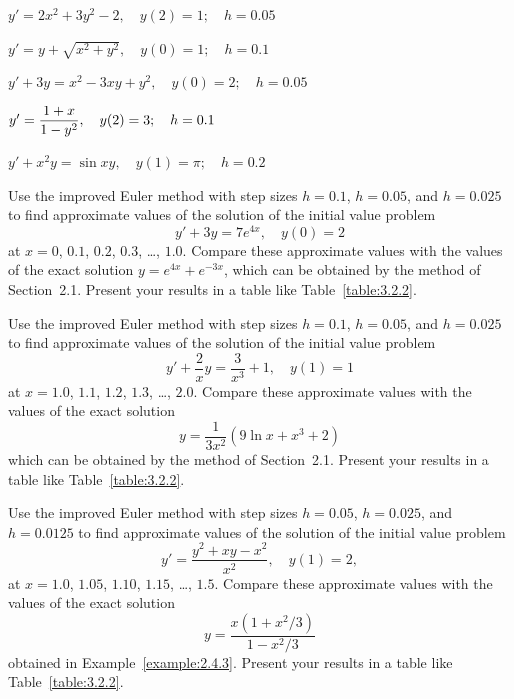 \begin{exerciselist}
  \item\label{exer:3.2.1} \Cex $y'=2x^{2}+3y^{2}-2,\quad y(2)=1;\quad h=0.05$ \,

  \item\label{exer:3.2.2} \Cex $y'=y+\sqrt{x^{2}+y^{2}},\quad y(0)=1;\quad h=0.1$ \,

  \item\label{exer:3.2.3} \Cex $y'+3y=x^{2}-3xy+y^{2},\quad y(0)=2;\quad h=0.05$ \,

  \item\label{exer:3.2.4} \Cex $y'=\displaystyle\frac{1+x}{1-y^{2}},\quad y(2)=3;\quad h=0.1$\

  \item\label{exer:3.2.5} \Cex $y'+x^{2}y=\sin xy,\quad y(1)=\pi;\quad h=0.2$

  \item\label{exer:3.2.6} \Cex Use the improved Euler method with step sizes $h=0.1$, $h=0.05$, and
        $h=0.025$ to find approximate values of the solution of the initial value problem
  \[
    y'+3y=7e^{4x},\quad y(0)=2
  \]
  at $x=0$, $0.1$, $0.2$, $0.3$, \dots, $1.0$. Compare these approximate values with the values of
  the exact solution $y=e^{4x}+e^{-3x}$, which can be obtained by the method of Section~2.1. Present
  your results in a table like Table~\ref{table:3.2.2}.

  \item\label{exer:3.2.7} \Cex Use the improved Euler method with step sizes $h=0.1$, $h=0.05$, and
        $h=0.025$ to find approximate values of the solution of the initial value problem
  \[
    y'+\frac{2}{x}y=\frac{3}{x^{3}}+1,\quad y(1)=1
  \]
  at $x=1.0$, $1.1$, $1.2$, $1.3$, \dots, $2.0$. Compare these approximate values with the values of
  the exact solution
  \[
    y=\frac{1}{3x^{2}}(9\ln x+x^{3}+2)
  \]
  which can be obtained by the method of Section~2.1. Present your results in a table like
  Table~\ref{table:3.2.2}.

  \item\label{exer:3.2.8} \Cex Use the improved Euler method with step sizes $h=0.05$, $h=0.025$,
        and $h=0.0125$ to find approximate values of the solution of the initial value problem
  \[
    y'=\frac{y^{2}+xy-x^{2}}{x^{2}},\quad y(1)=2,
  \]
  at $x=1.0$, $1.05$, $1.10$, $1.15$, \dots, $1.5$. Compare these approximate values with the values
  of the exact solution
  \[
    y=\frac{x(1+x^{2}/3)}{1-x^{2}/3}
  \]
  obtained in Example~\ref{example:2.4.3}. Present your results in a table like
  Table~\ref{table:3.2.2}.


\end{exerciselist}
